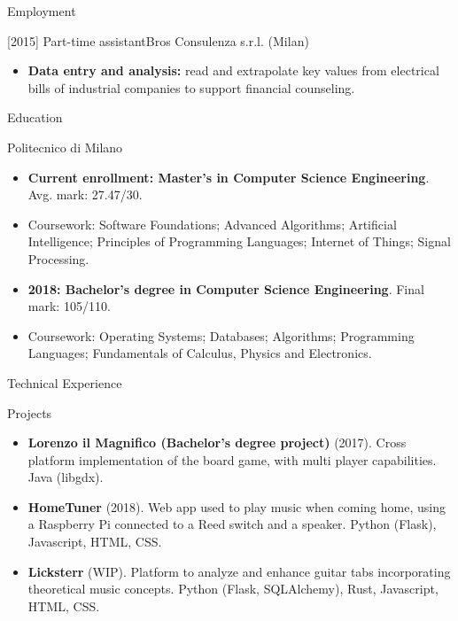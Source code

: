 \documentclass[]{cv}
\begin{document}
	\makeheader
	
	\begin{cvsection}{Employment}
		\begin{cvsubsection}{[2015] Part-time assistant}{Bros Consulenza s.r.l. (Milan)}{}
			\begin{itemize}
				\item \textbf{Data entry and analysis:} read and extrapolate key values from electrical bills of industrial companies to support financial counseling.
			\end{itemize}
		\end{cvsubsection}
	\end{cvsection}
		
	\begin{cvsection}{Education}
		\begin{cvsubsection}{Politecnico di Milano}{}{}
			\begin{itemize}
				\item \textbf{Current enrollment: Master's in Computer Science Engineering}. Avg. mark: 27.47/30.
				\item Coursework: Software Foundations; Advanced Algorithms; Artificial Intelligence; Principles of Programming Languages; Internet of Things; Signal Processing.
				\item \textbf{2018: Bachelor's degree in Computer Science Engineering}. Final mark: 105/110.
				\item Coursework: Operating Systems; Databases; Algorithms; Programming Languages; Fundamentals of Calculus, Physics and Electronics.
			\end{itemize}
		\end{cvsubsection}
	\end{cvsection}
	
	\begin{cvsection}{Technical Experience}
		\begin{cvsubsection}{Projects}{}{}
			\begin{itemize}
				\item \textbf{Lorenzo il Magnifico (Bachelor's degree project)} (2017). Cross platform implementation of the board game, with multi player capabilities.  Java (libgdx).
				\item \textbf{HomeTuner} (2018). Web app used to play music when coming home, using a Raspberry Pi connected to a Reed switch and a speaker.  Python (Flask), Javascript, HTML, CSS.
				\item \textbf{Licksterr} (WIP). Platform to analyze and enhance guitar tabs incorporating theoretical music concepts.  Python (Flask, SQLAlchemy), Rust, Javascript, HTML, CSS.
			\end{itemize}
		\end{cvsubsection}
	\end{cvsection}
	
\end{document}

